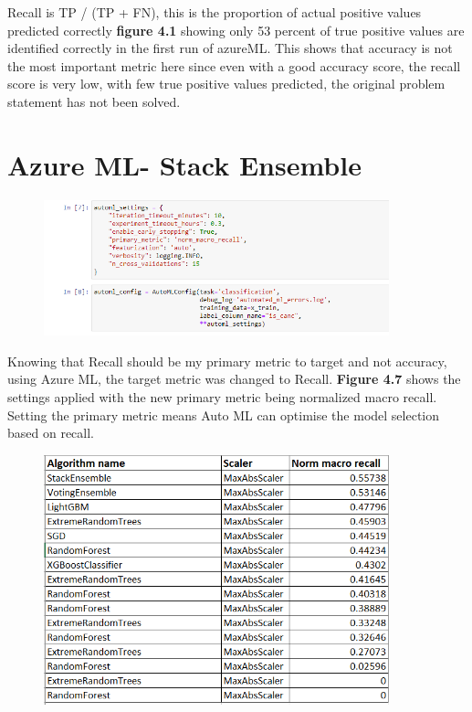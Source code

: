Recall is TP / (TP + FN), this is the proportion of actual positive values predicted correctly \textbf{figure 4.1} showing only 53 percent of true positive values are identified correctly in the first run of azureML. This shows that accuracy is not the most important metric here since even with a good accuracy score, the recall score is very low, with few true positive values predicted, the original problem statement has not been solved. 

\section{Azure ML- Stack Ensemble}

 \begin{figure}[H]
\includegraphics[width=10cm]{figures/auto_ml_settings.png}
 \caption{}
\end{figure}

Knowing that Recall should be my primary metric to target and not accuracy, using Azure ML, the target metric was changed to Recall. \textbf{Figure 4.7} shows the settings applied with the new primary metric being normalized macro recall. Setting the primary metric means Auto ML can optimise the model selection based on recall.

 \begin{figure}[H]
\includegraphics[width=10cm]{figures/auto_ml_final_models.png}
 \caption{}
\end{figure}

